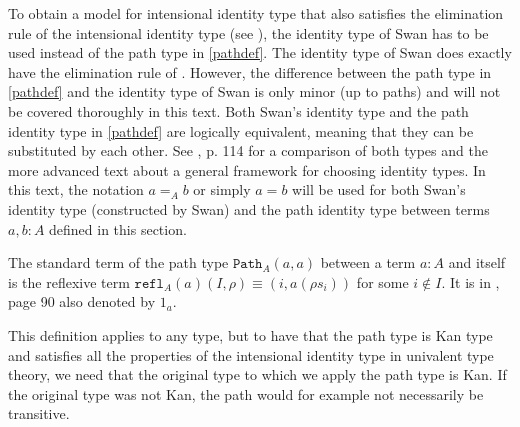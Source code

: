 \documentclass[12pt,a4paper,twoside,xetex,draft]{book}
\newcommand{\op}[1]{\mathtt{#1}}
\begin{document}
To obtain a model for intensional identity type that also satisfies the elimination rule of the intensional identity type (see \label{pathindprop}), the identity type of Swan \cite{Swan2014} has to be used instead of the path type in \cref{pathdef}. The identity type of Swan does exactly have the elimination rule of \label{pathindprop}. However, the difference between the path type in \cref{pathdef} and the identity type of Swan is only minor (up to paths) and will not be covered thoroughly in this text. Both Swan's identity type and the path identity type in \cref{pathdef} are logically equivalent, meaning that they can be substituted by each other. See  \cite{Huber2016}, p. 114 for a comparison of both types and the more advanced text \cite{Swa18} about a general framework for choosing identity types. In this text, the notation $a =_A b$ or simply $a = b$ will be used for both Swan's identity type (constructed by Swan) and the path identity type between terms $a, b: A$ defined in this section. 

The standard term of the path type $\op{Path}_A(a,a)$ between a term $a : A$ and itself  is the reflexive term $\op{refl}_A(a)(I,\rho) \equiv (i, a(\rho s_i))$ for some $i \not \in I$. It is in \cite{Huber2016}, page 90 also denoted by $1_a$.

This definition applies to any type, but to have that the path type is Kan type and satisfies all the properties of the intensional identity type in univalent type theory, we need that the original type to which we apply the path type is Kan. If the original type was not Kan, the path would for example not necessarily be transitive. 
\end{document}
